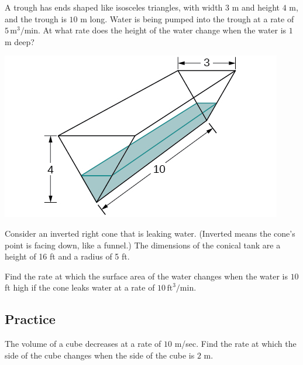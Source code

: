 \begin{example}

A trough has ends shaped like isosceles triangles, with width \(3\) m
and height \(4\) m, and the trough is \(10\) m long. Water is being
pumped into the trough at a rate of \(5\,\text{m}^3\text{/min}\). At
what rate does the height of the water change when the water is \(1\) m
deep?

\includegraphics[scale=0.8]{img/CNX_Calc_Figure_04_01_204.jpeg}

\end{example}
\vspace*{6\baselineskip}

\begin{example}

Consider an inverted right cone that is leaking water. (Inverted means the cone's point is facing down, like a funnel.) The dimensions of the conical tank are a height of 16 ft and a radius of 5 ft.

Find the rate at which the surface area of the water changes when the
water is \(10\) ft high if the cone leaks water at a rate of
\(10 \,\text{ft}^3\text{/min}\).

\end{example}
\vspace*{6\baselineskip}

\subsection{Practice}

\begin{exercise}

The volume of a cube decreases at a rate of \(10\) m/sec. Find the rate
at which the side of the cube changes when the side of the cube is \(2\)
m.

\end{exercise}
\vspace*{6\baselineskip}


